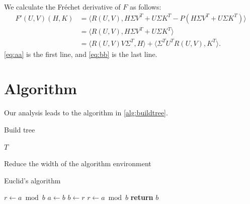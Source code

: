 \documentclass[openany,twoside,12pt]{book}
\theoremstyle{plain}
\numberwithin{equation}{chapter}
\numberwithin{figure}{chapter}
\numberwithin{table}{chapter}
\begin{document}
We calculate the Fr\'{e}chet derivative of $F$ as follows:
\begin{subequations}
\begin{align}
  F'(U,V)(H,K)
  &= \langle R(U,V),H\Sigma V^{T} + U\Sigma K^{T} -
  P(H\Sigma V^{T} + U\Sigma K^{T})\rangle \label{eq:aa} \\
  &= \langle R(U,V),H\Sigma V^{T} + U\Sigma K^{T}\rangle
  \nonumber \\
  &= \langle R(U,V)V\Sigma^{T},H\rangle +
  \langle \Sigma^{T}U^{T}R(U,V),K^{T}\rangle. \label{eq:bb}
\end{align}
\end{subequations}
\ref{eq:aa} is the first line, and \ref{eq:bb} is the last line.

\section{Algorithm}
\label{sec:alg}

Our analysis leads to the algorithm in \ref{alg:buildtree}.

\begin{algorithm}
\caption{Build tree}
\label{alg:buildtree}
\begin{algorithmic}
  \EndWhile
  \Return $T$
\end{algorithmic}
\end{algorithm}

\clearpage
Reduce the width of the algorithm environment
\begin{center}
\vspace{-2ex}
\begin{minipage}{0.9\linewidth}
\begin{algorithm}[H]
\caption{Euclid’s algorithm}
\label{euclid}
\begin{algorithmic} %
     
        \State $r\gets a \bmod b$
         
            \State $a \gets b$
            \State $b \gets r$
            \State $r \gets a \bmod b$
        \EndWhile\label{euclidendwhile}
            \State \textbf{return} $b$
    \EndProcedure
\end{algorithmic}
\end{algorithm}
\end{minipage}
\end{center}
\end{document}

